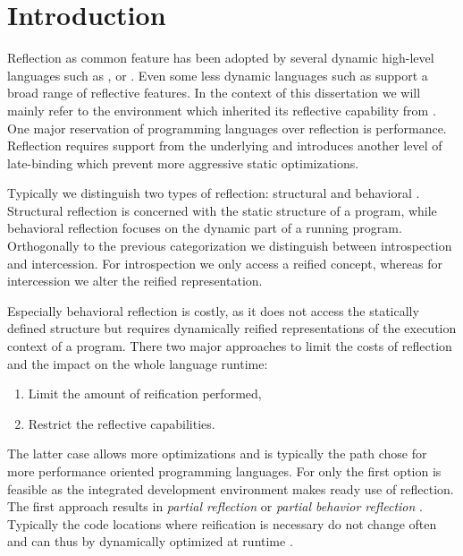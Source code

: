 
\chapter{Introduction}
\minitoc

\noindent Reflection as common feature has been adopted by several dynamic high-level languages such as ,  or .
Even some less dynamic languages such as \Java support a broad range of reflective features.
In the context of this dissertation we will mainly refer to the \PH environment which inherited its reflective capability from \ST.
One major reservation of programming languages over reflection is performance.
Reflection requires support from the underlying \VM and introduces another level of late-binding which prevent more aggressive static optimizations.

Typically we distinguish two types of reflection: structural and behavioral \cite{maes}.
Structural reflection is concerned with the static structure of a program, while behavioral reflection focuses on the dynamic part of a running program.
Orthogonally to the previous categorization we distinguish between introspection and intercession. 
For introspection we only access a reified concept, whereas for intercession we alter the reified representation.

Especially behavioral reflection is costly, as it does not access the statically defined structure but requires dynamically reified representations of the execution context of a program.
There two major approaches to limit the costs of reflection and the impact on the whole language runtime:
\begin{enumerate}
	\item Limit the amount of reification performed,
	\item Restrict the reflective capabilities.
\end{enumerate}
The latter case allows more optimizations and is typically the path chose for more performance oriented programming languages.
For \PH only the first option is feasible as the integrated development environment makes ready use of reflection.
The first approach results in \emph{partial reflection} \cite{} or \emph{partial behavior reflection} \cite{}.
Typically the code locations where reification is necessary do not change often and can thus by dynamically optimized at runtime \cite{Gepetto}.

